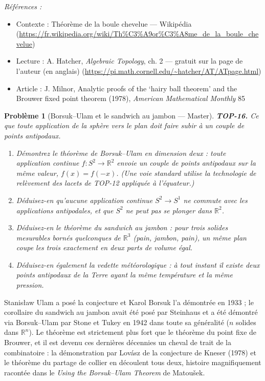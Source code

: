\documentclass[11pt]{article}
\newtheorem{problem}{Problème}
\newenvironment{refs}{\par\small\noindent\emph{Références :}\begin{itemize}\setlength\itemsep{0pt}}{\end{itemize}\normalsize}
\begin{document}
\begin{refs}
\item Contexte : Théorème de la boule chevelue --- Wikipédia (\url{https://fr.wikipedia.org/wiki/Th%C3%A9or%C3%A8me_de_la_boule_chevelue})
\item Lecture : A. Hatcher, \textit{Algebraic Topology}, ch. 2 --- gratuit sur la page de l'auteur (en anglais) (\url{https://pi.math.cornell.edu/~hatcher/AT/ATpage.html})
\item Article : J. Milnor, \og{} Analytic proofs of the `hairy ball theorem' and the Brouwer fixed point theorem \fg{} (1978), \textit{American Mathematical Monthly} 85
\end{refs}

\bigskip

\begin{problem}[{Borsuk--Ulam et le sandwich au jambon --- Master}]
\textbf{TOP-16.} Ce que toute application de la sphère vers le plan doit faire subir à un couple de
points antipodaux.
\begin{enumerate}
\item[(a)] Démontrez le théorème de Borsuk--Ulam en dimension deux : toute application continue
$ f : S^2 \to \mathbb{R}^2 $ envoie un couple de points antipodaux sur la même valeur,
$ f(x) = f(-x) $. (Une voie standard utilise la technologie de relèvement des lacets de TOP-12
appliquée à l'équateur.)
\item[(b)] Déduisez-en qu'aucune application continue $ S^2 \to S^1 $ ne commute avec les applications
antipodales, et que $ S^2 $ ne peut pas se plonger dans $ \mathbb{R}^2 $.
\item[(c)] Déduisez-en le théorème du sandwich au jambon : pour trois solides mesurables bornés quelconques de
$ \mathbb{R}^3 $ (pain, jambon, pain), un même plan coupe les trois exactement en deux parts de volume
égal.
\item[(d)] Déduisez-en également la vedette météorologique : à tout instant il existe deux points antipodaux
de la Terre ayant la même température \textit{et} la même pression.
\end{enumerate}

\end{problem}

\noindent Stanis\l{}aw Ulam a posé la conjecture et Karol Borsuk l'a démontrée en 1933 ; le
corollaire du sandwich au jambon avait été posé par Steinhaus et a été démontré via Borsuk--Ulam par Stone
et Tukey en 1942 dans toute sa généralité ($ n $ solides dans $ \mathbb{R}^n $). Le théorème est
strictement plus fort que le théorème du point fixe de Brouwer, et il est devenu ces dernières décennies
un cheval de trait de la combinatoire : la démonstration par Lovász de la conjecture de Kneser (1978) et
le théorème du partage de collier en découlent tous deux, histoire magnifiquement racontée dans le
\textit{Using the Borsuk--Ulam Theorem} de Matou\v{s}ek.
\end{document}
